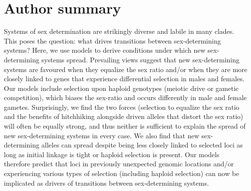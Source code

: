 \documentclass[10pt,letterpaper]{article}
\begin{document}
\section*{Author summary}
Systems of sex determination are strikingly diverse and labile in many clades. 
This poses the question: what drives transitions between sex-determining systems? 
Here, we use models to derive conditions under which new sex-determining systems spread. 
Prevailing views suggest that new sex-determining systems are favoured when they equalize the sex ratio and/or when they are more closely linked to genes that experience differential selection in males and females. 
Our models include selection upon haploid genotypes (meiotic drive or gametic competition), which biases the sex-ratio and occurs differently in male and female gametes. 
Surprisingly, we find the two forces (selection to equalize the sex ratio and the benefits of hitchhiking alongside driven alleles that distort the sex ratio) will often be equally strong, and thus neither is sufficient to explain the spread of new sex-determining systems in every case. 
We also find that new sex-determining alleles can spread despite being less closely linked to selected loci as long as initial linkage is tight or haploid selection is present.
Our models therefore predict that loci in previously unexpected genomic locations and/or experiencing various types of selection (including haploid selection) can now be implicated as drivers of transitions between sex-determining systems. 

\linenumbers

\end{document}
